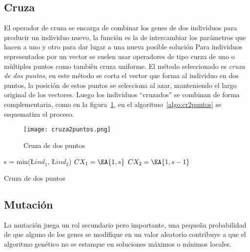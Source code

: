 \subsection{Cruza}
%
El operador de cruza se encarga de combinar los genes de dos individuos para
producir un individuo nuevo, la función es la de intercambiar los parámetros que
hacen a uno y otro para dar lugar a una nueva posible solución
%
Para individuos representados por un vector se suelen usar operadores de tipo
curza de uno o mùltiples puntos como tambièn cruza uniforme.
%
El método seleccionado es \emph{cruza de dos puntos}, en este método
se corta el vector que forma al individuo en dos puntos, la posición de estos
puntos se selecciona al azar, manteniendo el largo original de los vectores.
%
Luego los individuos ``cruzados'' se combinan de forma complementaria, como en
la figura~\ref{fig:cr2puntos}, en el algoritmo~\ref{algo:cr2puntos} se esquematiza
el proceso.

\begin{figure}
  \centering
  \texttt{[image: cruza2puntos.png]}
  \caption{Cruza de dos puntos}\label{fig:cr2puntos}
\end{figure}


\begin{algorithm}[]
  \BlankLine
  s = min(\L{$ind_{1}$}, \L {$ind_{2}$})\;
  $CX_{1} = \EA{1, s}$\;
  $CX_{2} = \EA{1, s-1}$\;
  \caption{Cruza de dos puntos}\label{algo:cr2puntos}
\end{algorithm}

\subsection{Mutación}
%
La mutación juega un rol secundario pero importante, una pequeña probabilidad
de que alguno de los genes se modifique en un valor aleatorio contribuye a que
el algoritmo genético no se estanque en soluciones máximos o mínimos locales.


